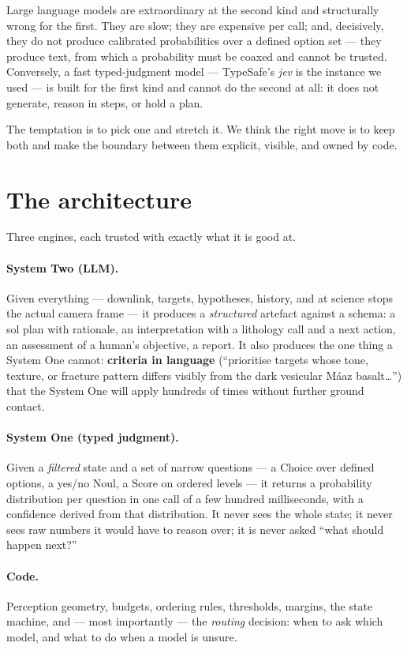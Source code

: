 \documentclass[11pt]{article}
\begin{document}
Large language models are extraordinary at the second kind and structurally wrong for the first. They are slow; they are expensive per call; and, decisively, they do not produce calibrated probabilities over a defined option set --- they produce text, from which a probability must be coaxed and cannot be trusted. Conversely, a fast typed-judgment model --- TypeSafe's \emph{jev} is the instance we used --- is built for the first kind and cannot do the second at all: it does not generate, reason in steps, or hold a plan.

The temptation is to pick one and stretch it. We think the right move is to keep both and make the boundary between them explicit, visible, and owned by code.

\section{The architecture}

Three engines, each trusted with exactly what it is good at.

\paragraph{System Two (LLM).} Given everything --- downlink, targets, hypotheses, history, and at science stops the actual camera frame --- it produces a \emph{structured} artefact against a schema: a sol plan with rationale, an interpretation with a lithology call and a next action, an assessment of a human's objective, a report. It also produces the one thing a System One cannot: \textbf{criteria in language} (``prioritise targets whose tone, texture, or fracture pattern differs visibly from the dark vesicular M\'aaz basalt\ldots'') that the System One will apply hundreds of times without further ground contact.

\paragraph{System One (typed judgment).} Given a \emph{filtered} state and a set of narrow questions --- a Choice over defined options, a yes/no Noul, a Score on ordered levels --- it returns a probability distribution per question in one call of a few hundred milliseconds, with a confidence derived from that distribution. It never sees the whole state; it never sees raw numbers it would have to reason over; it is never asked ``what should happen next?''

\paragraph{Code.} Perception geometry, budgets, ordering rules, thresholds, margins, the state machine, and --- most importantly --- the \emph{routing} decision: when to ask which model, and what to do when a model is unsure.
\end{document}
